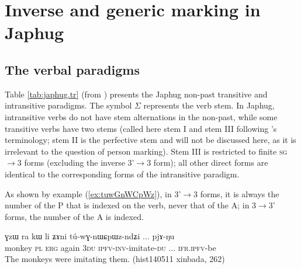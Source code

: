 \documentclass[oldfontcommands,oneside,a4paper,11pt]{article}
\newcommand{\ipa}[1]{{\phon \mbox{#1}}} %
\newcommand{\ro}{$\Sigma$}
\begin{document}
\section{Inverse and generic marking in Japhug} \label{sec:japhug}
\subsection{The verbal paradigms}
Table \ref{tab:japhug.tr} (from  \citealt{jacques10inverse}) presents the Japhug non-past transitive and intransitive paradigms. The symbol \ro{} represents the verb stem. In Japhug, intransitive verbs do not have stem alternations in the non-past, while some transitive verbs have two stems (called here stem I and stem III following \citealt{jackson00sidaba}'s terminology; stem II is the perfective stem and will not be discussed here, as it is irrelevant to the question of person marking). Stem III is restricted to finite \textsc{sg}$\rightarrow$3 forms (excluding the inverse 3'$\rightarrow$3 form); all other direct forms are identical to the corresponding forms of the intransitive paradigm.

As shown by example (\ref{ex:tuwGnWCpWz}), in 3'$\rightarrow$3 forms, it is always the number of the P that is indexed on the verb, never that of the A; in 3$\rightarrow$3' forms, the number of the A is indexed.

\begin{exe}
\ex \label{ex:tuwGnWCpWz}
\gll 
\ipa{ɣzɯ} 	\ipa{ra} 	\ipa{kɯ} 	\ipa{li} 	\ipa{ʑɤni} 	\ipa{tú-wɣ-nɯɕpɯz-ndʑi} ... \ipa{pjɤ-ŋu} \\
monkey \textsc{pl} \textsc{erg} again \textsc{3du} \textsc{ipfv-inv}-imitate-\textsc{du} ... \textsc{ifr.ipfv}-be \\
 \glt The monkeys were imitating them.  (hist140511 xinbada, 262)
\end{exe}
\end{document}
